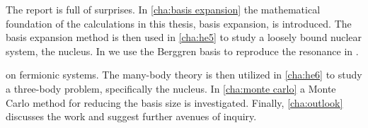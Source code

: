 \documentclass[../main/report.tex]{subfiles}
\begin{document}
The report is full of surprises.   In \cref{cha:basis expansion} the mathematical foundation of the calculations in this thesis, basis expansion, is introduced.
The basis expansion method is then used in \cref{cha:he5} to study a loosely bound nuclear system, the  nucleus.
In  we use the Berggren basis to reproduce the resonance in .

on fermionic systems. 
The many-body theory is then utilized in \cref{cha:he6} 
to study a three-body problem, specifically the  nucleus.  
In \cref{cha:monte carlo} a Monte Carlo method for reducing the basis size is investigated. 
Finally, \cref{cha:outlook} discusses the work and suggest further avenues of inquiry.
\end{document}
